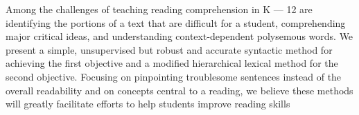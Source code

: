 Among the challenges of teaching reading comprehension in K --- 12 are identifying the portions of a text that are difficult for a student, comprehending major critical ideas, and understanding context-dependent polysemous words. We present a simple, unsupervised but robust and accurate syntactic method for achieving the first objective and a modified hierarchical lexical method for the second objective. Focusing on pinpointing troublesome sentences instead of the overall readability and on concepts central to a reading, we believe these methods will greatly facilitate efforts to help students improve reading skills
